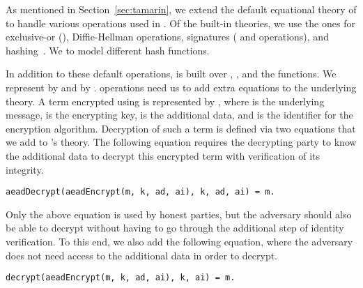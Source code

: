 As mentioned in Section~\ref{sec:tamarin}, we extend the default
equational theory of \mTamarin{} to handle various operations used in 
\mEdhoc.
%
Of the built-in theories, we use the ones for exclusive-or (\mXor),
Diffie-Hellman operations, signatures ( and  operations),
and 
hashing~\cite{DBLP:conf/csfw/DreierHRS18,DBLP:conf/csfw/SchmidtMCB12}.
%
We 
to
model different hash functions.
%

In addition to these default operations, \mEdhoc{} is built over
\mHkdfExpand, \mHkdfExtract, and the \mAead{} functions.
%
We represent \mHkdfExpand{} by  and \mHkdfExtract{} by 
.
%
\mAead{} operations need us to add extra equations to the underlying theory.
%
A term encrypted using \mAead{} is represented by ,
where  is the underlying message,  is the encrypting key,
 is the additional data, and  is the identifier for the
encryption algorithm.
%
Decryption of such a term is defined via two equations that we add to
\mTamarin's theory.
%
The following equation requires the decrypting party to know the additional
data  to decrypt this encrypted term with verification of its integrity.
\begin{small}
\begin{verbatim}
aeadDecrypt(aeadEncrypt(m, k, ad, ai), k, ad, ai) = m.
\end{verbatim}
\end{small}
%
Only the above equation is used by honest parties, but the adversary should
also be able to decrypt without having to go through the additional step of
identity verification.
%
To this end, we also add the following equation, where the adversary does not
need access to the additional data  in order to decrypt.
%
\begin{small}\begin{verbatim}
decrypt(aeadEncrypt(m, k, ad, ai), k, ai) = m.
\end{verbatim}\end{small}
%

